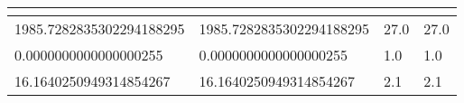 \begin{table}[!tbp]
\begin{center}
\begin{tabular}{llll}
\hline\hline
\multicolumn{1}{c}{}&\multicolumn{1}{c}{}&\multicolumn{1}{c}{}&\multicolumn{1}{c}{}\tabularnewline
\hline
1985.7282835302294188295&1985.7282835302294188295&27.0&27.0\tabularnewline
   0.0000000000000000255&   0.0000000000000000255& 1.0& 1.0\tabularnewline
  16.1640250949314854267&  16.1640250949314854267& 2.1& 2.1\tabularnewline
\hline
\end{tabular}\end{center}

\end{table}
